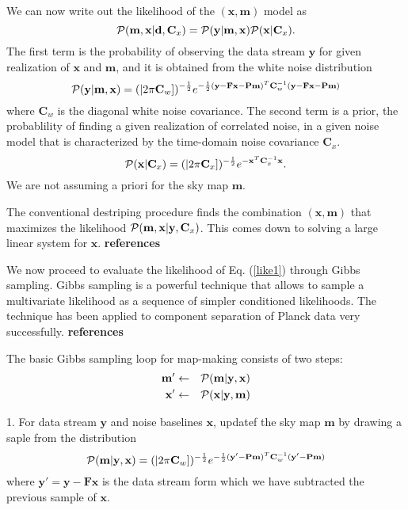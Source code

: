\documentclass[traditabstract]{aa}
\newcommand{\ve}[1]{{\mathbf #1}}
\newcommand{\ma}[1]{\mathbf{#1}}
\newcommand{\pcal}{{\cal P}}
\begin{document}
We can now write out the likelihood of the $(\ve x,\ve m)$ model as
%
\begin{equation}
\pcal(\ve m,\ve x\vert \ve d,\ma C_x) = \pcal(\ve y \vert \ve m,\ve x) \pcal(\ve x \vert \ma C_x) . \label{like1}
\end{equation}
%
The first term is the probability of observing the data stream $\ve y$
for given realization of $\ve x$ and $\ve m$, and it is obtained from the white noise distribution
%
%
\begin{equation}
\pcal(\ve y \vert \ve m,\ve x) = (|2\pi\ma{C}_w])^{-\frac12} 
e^{-\frac12(\ve y - \ma{F}\ve{x} -\ma{P}\ve{m} )^T\ma{C}_w^{-1}
                 (\ve y - \ma{F}\ve{x} -\ma{P}\ve{m} ) }
\end{equation}
%
where $\ma C_w$ is the diagonal white noise covariance.
The second term is a prior, the probablility of finding a given realization of correlated noise,
in a given noise model that is characterized by the time-domain noise covariance $\ma C_x$.
%
\begin{equation}
\pcal(\ve x \vert \ma C_x) = (|2\pi\ma{C}_x])^{-\frac12}  e^{-\ve{x}^T\ma{C}_x^{-1}\ve x}.
\end{equation}
%
We are not assuming a priori for the sky map $\ve m$.

The conventional destriping procedure finds the combination $(\ve x,\ve m)$ that maximizes 
the likelihood $\pcal(\ve m,\ve x\vert \ve y,\ma C_x)$.
This comes down to solving a large linear system for $\ve x$. {\bf references}

We now proceed to evaluate the likelihood of Eq. (\ref{like1})
through Gibbs sampling.  Gibbs sampling is a powerful technique that allows to sample a multivariate likelihood
as a sequence of simpler conditioned likelihoods.
The technique has been applied to component separation of Planck data very successfully. {\bf references}

The basic Gibbs sampling loop for map-making consists of two steps:
%
\begin{eqnarray}
 \ve{m'}  &\leftarrow& \pcal(\ve m \vert \ve{y},\ve x)   \nonumber \\
 \ve{x'}  &\leftarrow& \pcal(\ve x \vert \ve{y},\ve m)  
\end{eqnarray}

1.  For data stream $\ve y$ and noise baselines $\ve x$,
    updatef the sky map $\ve m$ by drawing a saple
    from the distribution
%
\begin{equation}
\pcal(\ve m \vert \ve y,\ve x) = (|2\pi\ma{C}_w])^{-\frac12} 
e^{-\frac12(\ve y' -\ma{P}\ve{m} )^T\ma{C}_w^{-1}
                 (\ve y' -\ma{P}\ve{m} ) }
\end{equation}
%
where $\ve y'=\ve y-\ma F\ve x$ is the data stream
form which we have subtracted
the previous sample of $\ve x$. \newline
\end{document}
